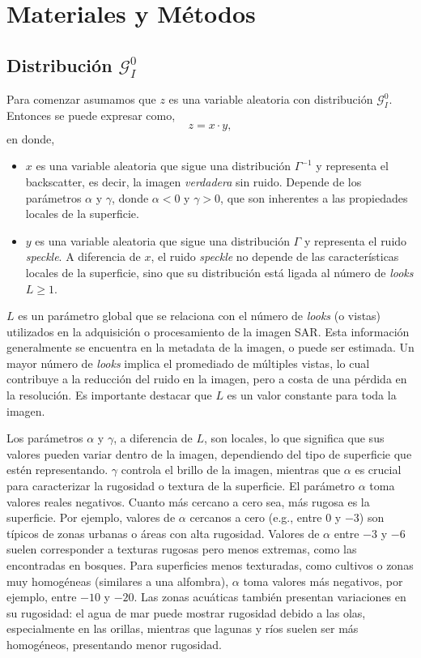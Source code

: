\chapter{Materiales y Métodos}
\label{materiales}

\section{Distribución \( \mathcal{G}_I^0 \)}

Para comenzar asumamos que $z$ es una variable aleatoria con distribución \( \mathcal{G}_I^0 \). Entonces se puede expresar como,
\begin{equation} \label{eq:zxy}
z = x \cdot y,
\end{equation}
en donde,
\begin{itemize}
    \item $x$ es una variable aleatoria que sigue una distribución $\Gamma^{-1}$ y representa el backscatter, es decir, la imagen \textit{verdadera} sin ruido. Depende de los parámetros $\alpha$ y $\gamma$, donde $\alpha < 0$ y $\gamma > 0$, que son inherentes a las propiedades locales de la superficie.
    \item $y$ es una variable aleatoria que sigue una distribución $\Gamma$ y representa el ruido \emph{speckle}. A diferencia de $x$, el ruido \emph{speckle} no depende de las características locales de la superficie, sino que su distribución está ligada al número de \emph{looks} $L\geq1$.
\end{itemize}
$L$ es un parámetro global que se relaciona con el número de \emph{looks} (o vistas) utilizados en la adquisición o procesamiento de la imagen SAR. Esta información generalmente se encuentra en la metadata de la imagen, o puede ser estimada. Un mayor número de \emph{looks} implica el promediado de múltiples vistas, lo cual contribuye a la reducción del ruido en la imagen, pero a costa de una pérdida en la resolución. Es importante destacar que $L$ es un valor constante para toda la imagen.

Los parámetros $\alpha$ y $\gamma$, a diferencia de $L$, son locales, lo que significa que sus valores pueden variar dentro de la imagen, dependiendo del tipo de superficie que estén representando. $\gamma$ controla el brillo de la imagen, mientras que $\alpha$ es crucial para caracterizar la rugosidad o textura de la superficie. El parámetro $\alpha$ toma valores reales negativos. Cuanto más cercano a cero sea, más rugosa es la superficie. Por ejemplo, valores de $\alpha$ cercanos a cero (e.g., entre $0$ y $-3$) son típicos de zonas urbanas o áreas con alta rugosidad. Valores de $\alpha$ entre $-3$ y $-6$ suelen corresponder a texturas rugosas pero menos extremas, como las encontradas en bosques. Para superficies menos texturadas, como cultivos o zonas muy homogéneas (similares a una alfombra), $\alpha$ toma valores más negativos, por ejemplo, entre $-10$ y $-20$. Las zonas acuáticas también presentan variaciones en su rugosidad: el agua de mar puede mostrar rugosidad debido a las olas, especialmente en las orillas, mientras que lagunas y ríos suelen ser más homogéneos, presentando menor rugosidad.

